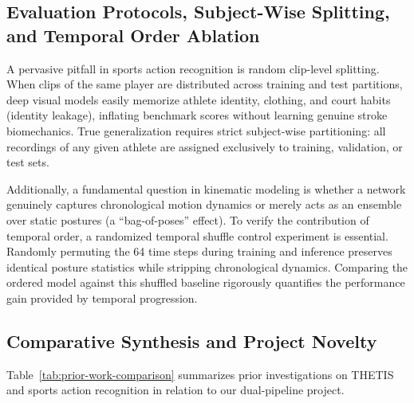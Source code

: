 \documentclass[12pt,a4paper]{article}
\begin{document}
\subsection{Evaluation Protocols, Subject-Wise Splitting, and Temporal Order Ablation}
A pervasive pitfall in sports action recognition is random clip-level splitting. When clips of the same player are distributed across training and test partitions, deep visual models easily memorize athlete identity, clothing, and court habits (identity leakage), inflating benchmark scores without learning genuine stroke biomechanics. True generalization requires strict subject-wise partitioning: all recordings of any given athlete are assigned exclusively to training, validation, or test sets.

Additionally, a fundamental question in kinematic modeling is whether a network genuinely captures chronological motion dynamics or merely acts as an ensemble over static postures (a ``bag-of-poses'' effect). To verify the contribution of temporal order, a randomized temporal shuffle control experiment is essential. Randomly permuting the 64 time steps during training and inference preserves identical posture statistics while stripping chronological dynamics. Comparing the ordered model against this shuffled baseline rigorously quantifies the performance gain provided by temporal progression.
\clearpage
\subsection{Comparative Synthesis and Project Novelty}
Table~\ref{tab:prior-work-comparison} summarizes prior investigations on THETIS and sports action recognition in relation to our dual-pipeline project.
\end{document}

